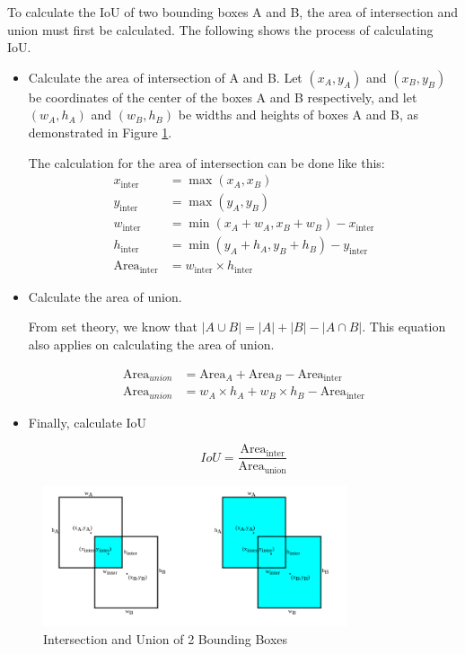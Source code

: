   
  To calculate the IoU of two bounding boxes A and B, the area of intersection and union must first
  be calculated. The following shows the process of calculating IoU.
  \begin{itemize}[topsep=0pt]
    \item Calculate the area of intersection of A and B. 
    Let $(x_A,y_A)$ and $(x_B,y_B)$ be coordinates of the center of the boxes A and B respectively,
    and let $(w_A,h_A)$ and $(w_B,h_B)$ be widths and heights of boxes A and B, as demonstrated in Figure \ref{fig:inter-union}.

    The calculation for the area of intersection can be done like this:
    \begin{align*}
      x_{\text{{inter}}} &= \max(x_A, x_B) \\
      y_{\text{{inter}}} &= \max(y_A, y_B) \\
      w_{\text{{inter}}} &= \min(x_A + w_A, x_B + w_B) - x_{\text{{inter}}} \\
      h_{\text{{inter}}} &= \min(y_A + h_A, y_B + h_B) - y_{\text{{inter}}} \\
      \text{Area}_{\text{inter}} &= w_{\text{{inter}}} \times h_{\text{{inter}}}
    \end{align*}

    \item Calculate the area of union.

    From set theory, we know that $|A \cup B| =|A| + |B| - |A \cap B| $.
    This equation also applies on calculating the area of union.

    \begin{align*}
      \text{Area}_{union} &= \text{Area}_A + \text{Area}_B - \text{Area}_{\text{inter}}\\
      \text{Area}_{union} &= w_A\times h_A + w_B\times h_B  - \text{Area}_{\text{inter}}
    \end{align*}

    \item Finally, calculate IoU

    \begin{equation}
      IoU = \frac{\text{Area}_{\text{inter}}}{\text{Area}_{\text{union}}}
    \end{equation}
  \end{itemize} 
   \begin{figure}[p]
        \centering
        \includegraphics[width=0.8\textwidth]{figures/inter-union.png}
        \caption{Intersection and Union of 2 Bounding Boxes}
        \label{fig:inter-union}
    \end{figure}
  


